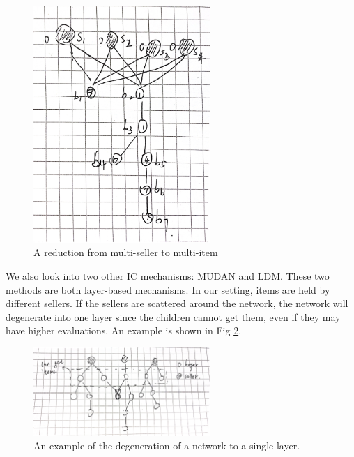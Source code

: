 \begin{figure}[htbp]
  \includegraphics[width=0.6\textwidth]{figure/Multi_reduce.jpg}
  \caption{A reduction from multi-seller to multi-item}
  \label{fig:MultiReduce}

\end{figure}

We also look into two other IC mechanisms: MUDAN and LDM. These two methods are both layer-based mechanisms.
In our setting, items are held by different sellers. If the sellers are scattered around the network, the
network will degenerate into one layer since the children cannot get them, even if they may have higher
evaluations. An example is shown in Fig \ref*{fig:LayerDegenerate}.
\begin{figure}
  \includegraphics[width=0.6\textwidth]{./figure/Layer_degenerate.jpg}
  \caption{An example of the degeneration of a network to a single layer. }
  \label{fig:LayerDegenerate}
\end{figure}
